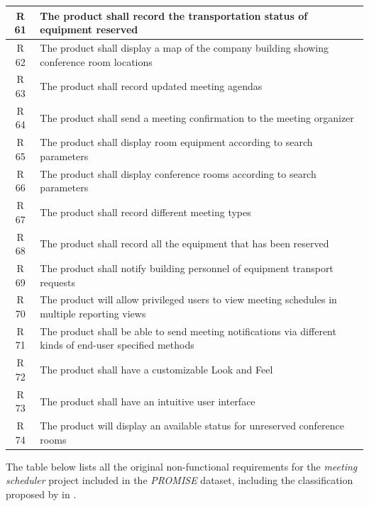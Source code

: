 \documentclass[dissertation,final]{softeng}
\begin{document}
\begin{appendices}
{\begin{center}
\begin{longtable}{c m{}}
    R 61  & The product shall record the transportation status of equipment reserved \\ \midrule
    R 62  & The product shall display a map of the company building showing conference room locations \\ \midrule
    R 63  & The product shall record updated meeting agendas \\ \midrule
    R 64  & The product shall send a meeting confirmation to the meeting organizer \\* \midrule
    R 65  & The product shall display room equipment according to search parameters \\ \midrule
    R 66  & The product shall display conference rooms according to search parameters \\ \midrule
    R 67  & The product shall record different meeting types \\ \midrule
    R 68  & The product shall record all the equipment that has been reserved \\ \midrule
    R 69  & The product shall notify building personnel of equipment transport requests \\ \midrule
    R 70  & The product will allow privileged users to view meeting schedules in multiple reporting views \\ \midrule
    R 71  & The product shall be able to send meeting notifications via different kinds of end-user specified methods \\ \midrule
    R 72  & The product shall have a customizable Look and Feel \\ \midrule
    R 73  & The product shall have an intuitive user interface \\ \midrule
    R 74  & The product will display an available status for unreserved conference rooms \\
\end{longtable}
\end{center}
}

The table below lists all the original non-functional requirements for the \emph{meeting scheduler} project included in  the \emph{PROMISE} dataset, including the classification proposed by \citeauthor{MylopoulosOnt2014} in \cite{MylopoulosOnt2014}.

\end{appendices}
\end{document}
